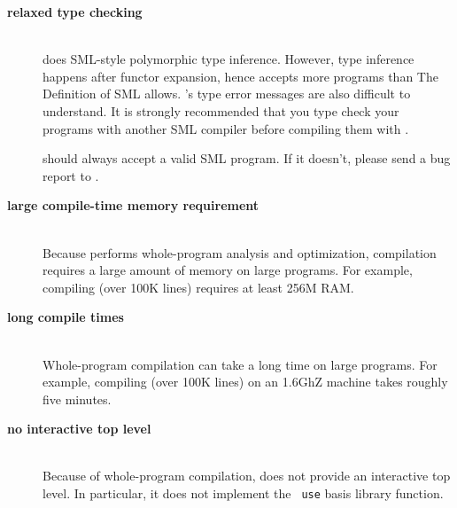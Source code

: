 
\newcommand{\drawback}[1]{\item[\bf #1]\hspace{1in}\\}

\begin{description}

\drawback{relaxed type checking}
{\mlton} does SML-style polymorphic type inference.  However, type
inference happens after functor expansion, hence {\mlton} accepts more
programs than The Definition of SML allows.  {\mlton}'s type error
messages are also difficult to understand.  It is strongly recommended
that you type check your programs with another SML compiler before
compiling them with {\mlton}.

{\mlton} should always accept a valid SML program.  If it doesn't,
please send a bug report to {\mltonmail}.

\drawback{large compile-time memory requirement}
Because {\mlton} performs whole-program analysis and optimization,
compilation requires a large amount of memory on large programs.  For
example, compiling {\mlton} (over 100K lines) requires at least 256M
RAM.

\drawback{long compile times}
Whole-program compilation can take a long time on large programs.  For
example, compiling {\mlton} (over 100K lines) on an 1.6GhZ machine
takes roughly five minutes.

\drawback{no interactive top level}
Because of whole-program compilation, {\mlton} does not provide an
interactive top level.  In particular, it does not implement the {\tt
use} basis library function.

\end{description}
